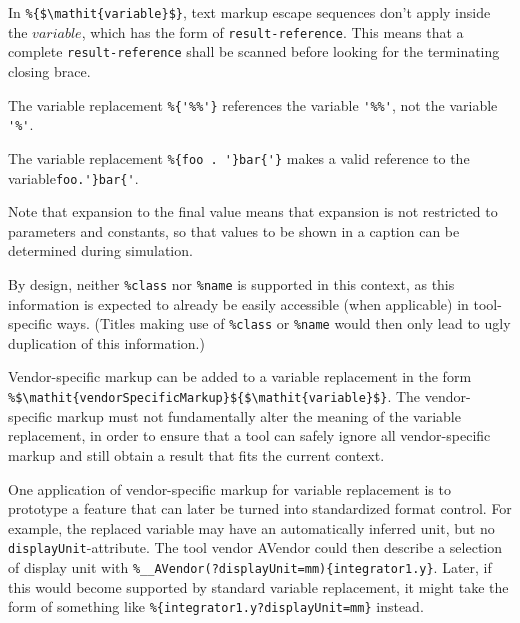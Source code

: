 In \lstinline!%{$\mathit{variable}$}!, text markup escape sequences don't apply inside the $\mathit{variable}$, which has the form of \lstinline[language=grammar]!result-reference!.
This means that a complete \lstinline[language=grammar]!result-reference! shall be scanned before looking for the terminating closing brace.

\begin{example}
The variable replacement \lstinline!%{'%%'}! references the variable \lstinline!'%%'!, not the variable \lstinline!'%'!.
\end{example}

\begin{example}
The variable replacement \lstinline!%{foo . '}bar{'}! makes a valid reference to the variable\linebreak[4] \lstinline!foo.'}bar{'!.
\end{example}

Note that expansion to the final value means that expansion is not restricted to parameters and constants, so that values to be shown in a caption can be determined during simulation.

\begin{nonnormative}
By design, neither \lstinline!%class! nor \lstinline!%name! is supported in this context, as this information is expected to already be easily accessible (when applicable) in tool-specific ways.
(Titles making use of \lstinline!%class! or \lstinline!%name! would then only lead to ugly duplication of this information.)
\end{nonnormative}

Vendor-specific markup can be added to a variable replacement in the form \lstinline!%$\mathit{vendorSpecificMarkup}${$\mathit{variable}$}!.
The vendor-specific markup must not fundamentally alter the meaning of the variable replacement, in order to ensure that a tool can safely ignore all vendor-specific markup and still obtain a result that fits the current context.

\begin{example}
One application of vendor-specific markup for variable replacement is to prototype a feature that can later be turned into standardized format control.
For example, the replaced variable may have an automatically inferred unit, but no \lstinline!displayUnit!-attribute.
The tool vendor AVendor could then describe a selection of display unit with \lstinline!%__AVendor(?displayUnit=mm){integrator1.y}!.
Later, if this would become supported by standard variable replacement, it might take the form of something like \lstinline!%{integrator1.y?displayUnit=mm}! instead.
\end{example}

